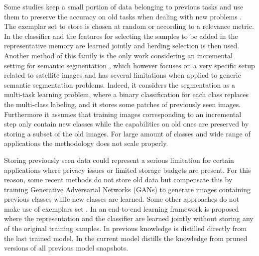 \documentclass[10pt,twocolumn,letterpaper]{article}
\begin{document}
Some studies keep a small portion of data belonging to previous tasks and use them to preserve the accuracy on old tasks when dealing with new problems \cite{castro2018end, chaudhry2018riemannian, hou2018lifelong, lopez2017gradient, rebuffi2017icarl, tasar2018incremental}. The exemplar set to store is chosen at random or according to a relevance metric. 
In \cite{castro2018end} the classifier and the features for selecting the samples to be added in the representative memory are learned jointly and herding selection is then used.
Another method of this family is the only work considering an incremental setting for semantic segmentation \cite{tasar2018incremental}, which however focuses on a very specific setup related to satellite images and has several limitations when applied to generic semantic segmentation problems. Indeed, it considers the segmentation  as a multi-task learning problem, where a binary classification for each class replaces the multi-class labeling, and it stores some patches of previously seen images. Furthermore it assumes that training images corresponding to an incremental step only contain new classes while the capabilities on old ones are preserved by storing a subset of the old images.
For large amount of classes and wide range of applications the methodology does not scale properly.

Storing previously seen data could represent a serious limitation for certain applications where privacy issues or limited storage budgets are present.
For this reason, some recent methods \cite{shin2017continual, wu2018incremental} do not store old data but compensate this by training Generative Adversarial Networks (GANs) to generate images containing previous classes while new classes are learned. Some other approaches do not make use of exemplars set \cite{aljundi2018memory, kirkpatrick2017overcoming, li2018learning, shmelkov2017incremental, dhar2018learning, zhou2019M2KD}. 
In \cite{shmelkov2017incremental} an end-to-end learning framework is proposed where the representation and the classifier are learned jointly without storing any of the original training samples.
In \cite{li2018learning} previous knowledge is distilled directly from the last trained model. 
In \cite{zhou2019M2KD} the current model distills the knowledge from pruned versions of all previous model snapshots.
\end{document}
